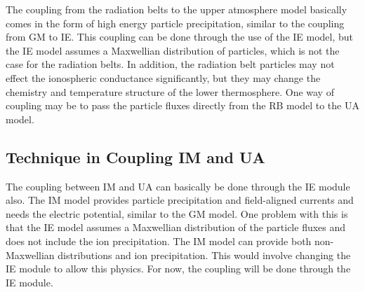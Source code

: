 The coupling from the radiation belts to the upper atmosphere model
basically comes in the form of high energy particle precipitation,
similar to the coupling from GM to IE.  This coupling can be done
through the use of the IE model, but the IE model assumes a Maxwellian
distribution of particles, which is not the case for the radiation
belts.  In addition, the radiation belt particles may not effect the
ionospheric conductance significantly, but they may change the
chemistry and temperature structure of the lower thermosphere.  One
way of coupling may be to pass the particle fluxes directly from the
RB model to the UA model.

\subsection{Technique in Coupling IM and UA}

The coupling between IM and UA can basically be done through the IE
module also.  The IM model provides particle precipitation and
field-aligned currents and needs the electric potential, similar to
the GM model.  One problem with this is that the IE model assumes a
Maxwellian distribution of the particle fluxes and does not include
the ion precipitation.  The IM model can provide both non-Maxwellian
distributions and ion precipitation.  This would involve changing the
IE module to allow this physics.  For now, the coupling will be done
through the IE module.




%
%

%
